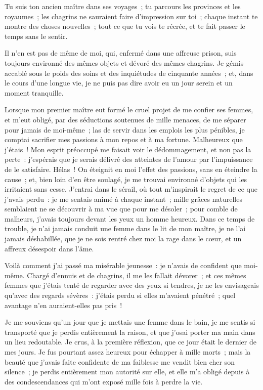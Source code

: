 \documentclass[french,twoside]{book} %
\begin{document}
\noindent Tu suis ton ancien maître dans ses voyages ; tu parcours les provinces et les royaumes ; les chagrins ne sauraient faire d’impression sur toi ; chaque instant te montre des choses nouvelles ; tout ce que tu vois te récrée, et te fait passer le temps sans le sentir.\par
Il n’en est pas de même de moi, qui, enfermé dans une affreuse prison, suis toujours environné des mêmes objets et dévoré des mêmes chagrins. Je gémis accablé sous le poids des soins et des inquiétudes de cinquante années ; et, dans le cours d’une longue vie, je ne puis pas dire avoir eu un jour serein et un moment tranquille.\par
Lorsque mon premier maître eut formé le cruel projet de me confier ses femmes, et m’eut obligé, par des séductions soutenues de mille menaces, de me séparer pour jamais de moi-même ; las de servir dans les emplois les plus pénibles, je comptai sacrifier mes passions à mon repos et à ma fortune. Malheureux que j’étais ! Mon esprit préoccupé me faisait voir le dédommagement, et non pas la perte : j’espérais que je serais délivré des atteintes de l’amour par l’impuissance de le satisfaire. Hélas ! On éteignit en moi l’effet des passions, sans en éteindre la cause ; et, bien loin d’en être soulagé, je me trouvai environné d’objets qui les irritaient sans cesse. J’entrai dans le sérail, où tout m’inspirait le regret de ce que j’avais perdu : je me sentais animé à chaque instant ; mille grâces naturelles semblaient ne se découvrir à ma vue que pour me désoler ; pour comble de malheurs, j’avais toujours devant les yeux un homme heureux. Dans ce temps de trouble, je n’ai jamais conduit une femme dans le lit de mon maître, je ne l’ai jamais déshabillée, que je ne sois rentré chez moi la rage dans le cœur, et un affreux désespoir dans l’âme.\par
Voilà comment j’ai passé ma misérable jeunesse : je n’avais de confident que moi-même. Chargé d’ennuis et de chagrins, il me les fallait dévorer ; et ces mêmes femmes que j’étais tenté de regarder avec des yeux si tendres, je ne les envisageais qu’avec des regards sévères : j’étais perdu si elles m’avaient pénétré ; quel avantage n’en auraient-elles pas pris !\par
Je me souviens qu’un jour que je mettais une femme dans le bain, je me sentis si transporté que je perdis entièrement la raison, et que j’osai porter ma main dans un lieu redoutable. Je crus, à la première réflexion, que ce jour était le dernier de mes jours. Je fus pourtant assez heureux pour échapper à mille morts ; mais la beauté que j’avais faite confidente de ma faiblesse me vendit bien cher son silence ; je perdis entièrement mon autorité sur elle, et elle m’a obligé depuis à des condescendances qui m’ont exposé mille fois à perdre la vie.\par
\end{document}
